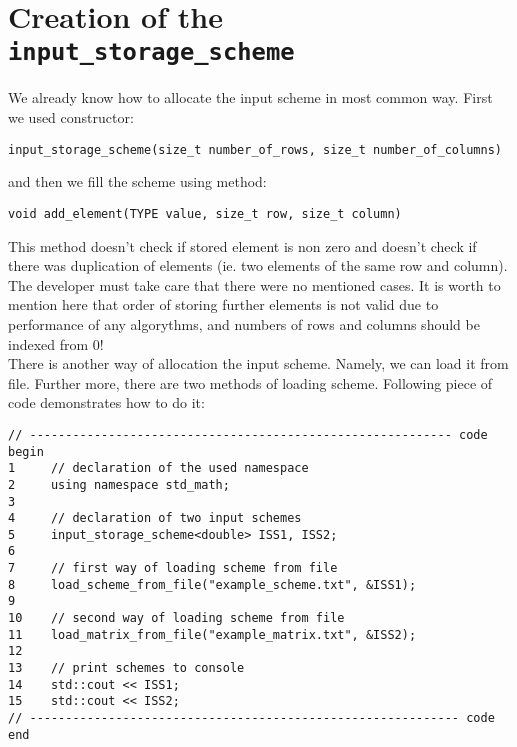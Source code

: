 \section{Creation of the \texttt{input\_storage\_scheme}}
We already know how to allocate the input scheme in most common way. First we used constructor:
\begin{verbatim}
input_storage_scheme(size_t number_of_rows, size_t number_of_columns)
\end{verbatim}
\noindent and then we fill the scheme using method:
\begin{verbatim}
void add_element(TYPE value, size_t row, size_t column)
\end{verbatim}
This method doesn't check if stored element is non zero and doesn't check if there was duplication of elements (ie. two elements of the same row and column). The developer must take care that there were no mentioned cases. It is worth to mention here that order of storing further elements is not valid due to performance of any algorythms, and numbers of rows and columns should be indexed from $0$!\\
\indent There is another way of allocation the input scheme. Namely, we can load it from file. Further more, there are two methods of loading scheme. Following piece of code demonstrates how to do it:

\begin{verbatim}
// ----------------------------------------------------------- code begin
1     // declaration of the used namespace
2     using namespace std_math;
3
4     // declaration of two input schemes
5     input_storage_scheme<double> ISS1, ISS2;
6
7     // first way of loading scheme from file
8     load_scheme_from_file("example_scheme.txt", &ISS1);
9
10    // second way of loading scheme from file
11    load_matrix_from_file("example_matrix.txt", &ISS2);
12
13    // print schemes to console
14    std::cout << ISS1;
15    std::cout << ISS2;
// ------------------------------------------------------------ code end
\end{verbatim}

